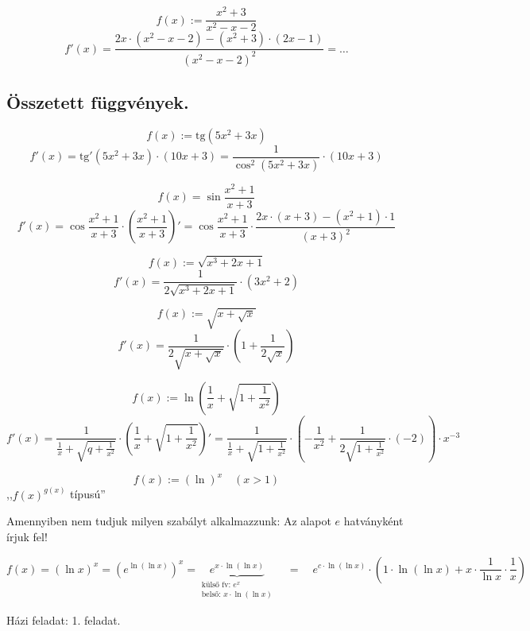 \documentclass[a4paper,11.5pt]{article}
\begin{document}
	\begin{task}
		\[ f(x):=\frac{x^2+3}{x^2-x-2} \]
		\[ f'(x)=\frac{2x\cdot(x^2-x-2)-(x^2+3)\cdot(2x-1)}{(x^2-x-2)^2}=\ldots \]
	\end{task}\subsection{
	Összetett függvények.}
	\begin{task}
		\[ f(x):=\text{tg}(5x^2+3x) \]
		\[ f'(x)=\text{tg}'(5x^2+3x)\cdot(10x+3)=\frac{1}{\cos^2(5x^2+3x)}\cdot(10x+3) \]
	\end{task}
	\begin{task}
		\[ f(x)=\sin\frac{x^2+1}{x+3} \]
		\[ f'(x)=\cos\frac{x^2+1}{x+3}\cdot\left(\frac{x^2+1}{x+3}\right)' = \cos\frac{x^2+1}{x+3}\cdot\frac{2x\cdot(x+3)-(x^2+1)\cdot1}{(x+3)^2} \]
	\end{task}
	\begin{task}
		\[ f(x):=\sqrt{x^3+2x+1} \]
		\[ f'(x)=\frac{1}{2\sqrt{x^3+2x+1}}\cdot\left(3x^2+2\right) \]
	\end{task}
	\begin{task}
		\[ f(x):=\sqrt{x+\sqrt{x}} \]
		\[ f'(x)=\frac{1}{2\sqrt{x+\sqrt{x}}}\cdot\left(1+\frac{1}{2\sqrt{x}}\right) \]
	\end{task}
	\begin{task}
		\[ f(x):=\ln\left(\frac{1}{x}+\sqrt{1+\frac{1}{x^2}}\right) \]
		\[ f'(x)=\frac{1}{\frac{1}{x}+\sqrt{q+\frac{1}{x^2}}}\cdot\left(\frac{1}{x}+\sqrt{1+\frac{1}{x^2}}\right)'= \frac{1}{\frac{1}{x}+\sqrt{1+\frac{1}{x^2}}}\cdot\left(-\frac{1}{x^2}+\frac{1}{2\sqrt{1+\frac{1}{x^2}}}\cdot(-2)\right)\cdot x^{-3} \]
	\end{task}
	\begin{task}
		\[f(x):=(\ln)^x\quad (x>1) \]
		,,$f(x)^{g(x)}$ típusú''
		\begin{note}
			Amennyiben nem tudjuk milyen szabályt alkalmazzunk: Az alapot $e$ hatványként írjuk fel! 
		\end{note}
		\[ f(x)=(\ln x)^x=\left(e^{\ln(\ln x)}\right)^x=\underbrace{e^{x\cdot\ln(\ln x)}}_{\substack{\text{külső fv: } e^x \\ \text{belső: }x\cdot\ln(\ln x)}}\quad =\quad e^{c\cdot\ln(\ln x)}\cdot\left(1\cdot\ln(\ln x)+x\cdot\frac{1}{\ln x}\cdot\frac{1}{x}\right) \]
	\end{task}
	Házi feladat: 1. feladat.
\end{document}

